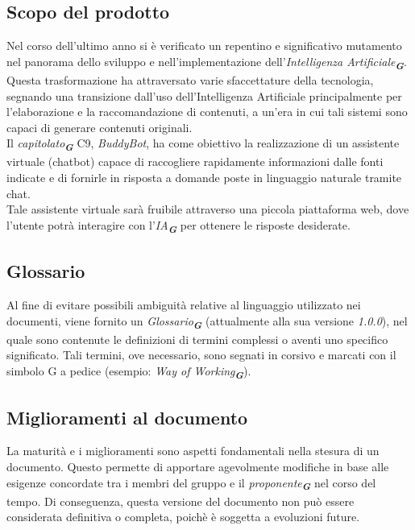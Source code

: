 \subsection{Scopo del prodotto}
Nel corso dell'ultimo anno si è verificato un repentino e significativo mutamento nel panorama
dello sviluppo e nell'implementazione dell'\emph{Intelligenza Artificiale}\textsubscript{\textit{\textbf{G}}}.
Questa trasformazione ha attraversato varie sfaccettature della tecnologia, segnando una transizione dall'uso
dell'Intelligenza Artificiale principalmente per l'elaborazione e la raccomandazione di contenuti, a un'era in
cui tali sistemi sono capaci di generare contenuti originali. \\
Il \emph{capitolato}\textsubscript{\textit{\textbf{G}}} C9, \emph{BuddyBot}, ha come obiettivo la realizzazione di un assistente virtuale (chatbot) 
capace di raccogliere rapidamente informazioni dalle fonti indicate e di fornirle in risposta a domande poste in 
linguaggio naturale tramite chat.\\
Tale assistente virtuale sarà fruibile attraverso una piccola piattaforma web, dove l'utente potrà interagire con l'\emph{IA}\textsubscript{\textit{\textbf{G}}} 
per ottenere le risposte desiderate.

\subsection{Glossario}
Al fine di evitare possibili ambiguità relative al linguaggio utilizzato nei documenti, viene fornito un \emph{Glossario}\textsubscript{\textit{\textbf{G}}}
(attualmente alla sua versione \emph{1.0.0}), nel quale sono contenute le definizioni di termini complessi o aventi uno 
specifico significato. Tali termini, ove necessario, sono segnati in corsivo e marcati con il simbolo G a pedice
(esempio: \emph{Way of Working}\textsubscript{\textit{\textbf{G}}}).

\subsection{Miglioramenti al documento}
La maturità e i miglioramenti sono aspetti fondamentali nella stesura di un documento.
Questo permette di apportare agevolmente modifiche in base alle esigenze concordate tra i
membri del gruppo e il \emph{proponente}\textsubscript{\textit{\textbf{G}}} nel corso del tempo. Di conseguenza, questa versione del
documento non può essere considerata definitiva o completa, poichè è soggetta a evoluzioni future.

